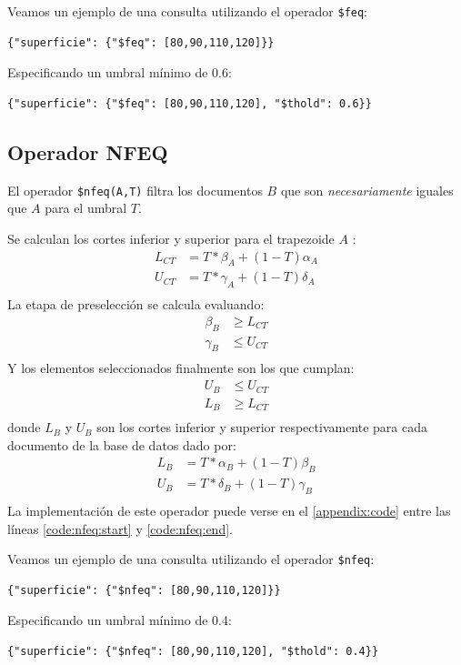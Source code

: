 \begin{example}
Veamos un ejemplo de una consulta utilizando el operador \texttt{\$feq}:
%
\begin{verbatim}
{"superficie": {"$feq": [80,90,110,120]}}
\end{verbatim}
%
Especificando un umbral mínimo de 0.6:
%
\begin{verbatim}         
{"superficie": {"$feq": [80,90,110,120], "$thold": 0.6}}
\end{verbatim}

\end{example}

\subsection{Operador NFEQ}

El operador \texttt{\$nfeq(A,T)} filtra los documentos $B$ que son \textit{necesariamente} iguales que $A$ para el umbral $T$.

Se calculan los cortes inferior y superior para el trapezoide $A$ \cite{indexingneccesary}:
%
\begin{align*}
    L_{CT} &= T * \beta_A + (1-T)\alpha_A \\
    U_{CT} &= T * \gamma_A + (1-T)\delta_A \\
\end{align*}
%
La etapa de preselección se calcula evaluando:
%
\begin{align*}
    \beta_B &\geq L_{CT} \\
    \gamma_B &\leq U_{CT} \\
\end{align*}
%
Y los elementos seleccionados finalmente son los que cumplan:
%
\begin{align*}
    U_B &\leq U_{CT} \\
    L_B &\geq L_{CT} \\
\end{align*}
%
donde $L_B$ y $U_B$ son los cortes inferior y superior respectivamente para cada documento de la base de datos dado por:
%
\begin{align*}
    L_B &= T * \alpha_B + (1-T)\beta_B \\
    U_B &= T * \delta_B + (1-T)\gamma_B \\
\end{align*}
%
La implementación de este operador puede verse en el \autoref{appendix:code} entre las líneas \ref{code:nfeq:start} y \ref{code:nfeq:end}.

\begin{example}
Veamos un ejemplo de una consulta utilizando el operador \texttt{\$nfeq}:
%
\begin{verbatim}
{"superficie": {"$nfeq": [80,90,110,120]}}
\end{verbatim}
%
Especificando un umbral mínimo de 0.4:
%
\begin{verbatim}         
{"superficie": {"$nfeq": [80,90,110,120], "$thold": 0.4}}
\end{verbatim}

\end{example}

